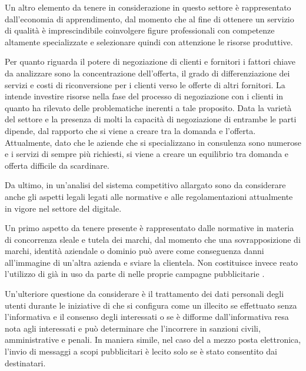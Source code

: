 Un altro elemento da tenere in considerazione in questo settore è rappresentato dall'economia di apprendimento, dal momento che al fine di ottenere un servizio di qualità è imprescindibile coinvolgere figure professionali con competenze altamente specializzate e selezionare quindi con attenzione le risorse produttive.

Per quanto riguarda il potere di negoziazione di clienti e  fornitori i fattori chiave da analizzare sono la concentrazione dell'offerta, il grado di differenziazione dei servizi e costi di riconversione per i clienti verso le offerte di altri fornitori.
La \customer intende investire risorse nella fase del processo di negoziazione con i clienti in quanto ha rilevato delle problematiche inerenti a tale proposito.
Data la varietà del settore e la presenza di molti  la capacità di negoziazione di entrambe le parti dipende, dal rapporto che si viene a creare tra la domanda e l'offerta. Attualmente, dato che le aziende che si specializzano in consulenza \mktg sono numerose e i servizi di \mktg sempre più richiesti, si viene a creare un equilibrio tra domanda e offerta difficile da scardinare. 

Da ultimo, in un'analisi del sistema competitivo allargato sono da considerare anche gli aspetti legali legati alle normative e alle regolamentazioni attualmente in vigore nel settore del \mktg digitale.

Un primo aspetto da tenere presente è rappresentato dalle normative in materia di concorrenza sleale e tutela dei marchi, dal momento che una sovrapposizione di marchi, identità aziendale o dominio  può avere come conseguenza danni all'immagine di un'altra azienda e sviare la clientela. Non costituisce invece reato l'utilizzo di  già in uso da parte di  nelle proprie campagne pubblicitarie .

Un'ulteriore questione da considerare è il trattamento dei dati personali degli utenti durante le iniziative di \mktg che si configura come un illecito se effettuato senza l'informativa e il consenso degli interessati o se è difforme dall'informativa resa nota agli interessati e può determinare che l'incorrere in sanzioni civili, amministrative e penali. In maniera simile, nel caso del \mktg a mezzo posta elettronica, l'invio di messaggi a scopi pubblicitari è lecito solo se è stato consentito dai destinatari.

